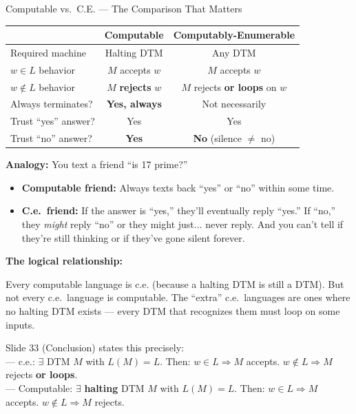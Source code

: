 \documentclass[11pt,a4paper]{article}
\newcommand{\kt}[1]{\par\vspace{0.3em}\colorbox{yellow!60}{\parbox{\dimexpr\linewidth-2\fboxsep}{#1}}\vspace{0.3em}}
\begin{document}
\begin{conceptbox}{Computable vs.\ C.E. --- The Comparison That Matters}

\begin{center}
\renewcommand{\arraystretch}{1.6}
\begin{tabular}{p{4cm}cc}
\toprule
& \textbf{Computable} & \textbf{Computably-Enumerable} \\
\midrule
Required machine & Halting DTM & Any DTM \\
$w \in L$ behavior & $M$ accepts $w$ & $M$ accepts $w$ \\
$w \notin L$ behavior & $M$ \textbf{rejects} $w$ & $M$ rejects \textbf{or loops} on $w$ \\
Always terminates? & \textbf{Yes, always} & Not necessarily \\
Trust ``yes'' answer? & Yes & Yes \\
Trust ``no'' answer? & \textbf{Yes} & \textbf{No} (silence $\neq$ no) \\
\bottomrule
\end{tabular}
\end{center}

\textbf{Analogy:} You text a friend ``is 17 prime?''
\begin{itemize}[nosep]
\item \textbf{Computable friend:} Always texts back ``yes'' or ``no'' within some time.
\item \textbf{C.e.\ friend:} If the answer is ``yes,'' they'll eventually reply ``yes.'' If ``no,'' they \textit{might} reply ``no'' or they might just... never reply. And you can't tell if they're still thinking or if they've gone silent forever.
\end{itemize}

\textbf{The logical relationship:}

Every computable language is c.e. (because a halting DTM is still a DTM). But not every c.e.\ language is computable. The ``extra'' c.e.\ languages are ones where no halting DTM exists --- every DTM that recognizes them must loop on some inputs.

\kt{Slide 33 (Conclusion) states this precisely:\\
--- c.e.: $\exists$ DTM $M$ with $L(M) = L$. Then: $w \in L \Rightarrow M$ accepts. $w \notin L \Rightarrow M$ rejects \textbf{or loops}.\\
--- Computable: $\exists$ \textbf{halting} DTM $M$ with $L(M) = L$. Then: $w \in L \Rightarrow M$ accepts. $w \notin L \Rightarrow M$ rejects.}
\end{conceptbox}
\end{document}
